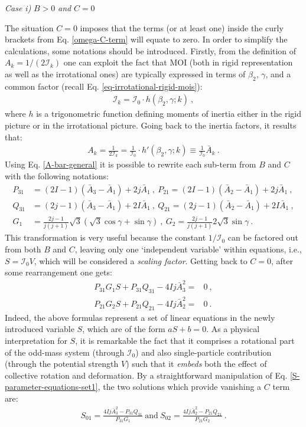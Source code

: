 \textit{Case i)} $B>0$ \textit{and} $C=0$

The situation $C=0$ imposes that the terms (or at least one) inside the curly brackets from Eq. \ref{omega-C-term} will equate to zero. In order to simplify the calculations, some notations should be introduced. Firstly, from the definition of $A_k=1/(2\mathcal{I}_k)$ one can exploit the fact that MOI (both in rigid representation as well as the irrotational ones) are typically expressed in terms of $\beta_2$, $\gamma$, and a common factor (recall Eq. \ref{eq-irrotational-rigid-mois}):
\begin{align}
    \mathcal{I}_k=\mathcal{I}_0\cdot h(\beta_2,\gamma;k)\ ,
\end{align}
where $h$ is a trigonometric function defining moments of inertia either in the rigid picture or in the irrotational picture. Going back to the inertia factors, it results that:
\begin{align}
    A_k=\frac{1}{2\mathcal{I}_k}=\frac{1}{\mathcal{I}_0}\cdot h'(\beta_2,\gamma;k)\equiv\frac{1}{\mathcal{I}_0}\bar{A}_k\ .
    \label{A-bar-general}
\end{align}
Using Eq. \ref{A-bar-general} it is possible to rewrite each sub-term from $B$ and $C$ with the following notations:
\begin{align}
    P_{31}&=(2I-1)(\bar{A}_3-\bar{A}_1)+2j\bar{A}_1\ ,\ P_{21}=(2I-1)(\bar{A}_2-\bar{A}_1)+2j\bar{A}_1\ , \nonumber\\
    Q_{31}&=(2j-1)(\bar{A}_3-\bar{A}_1)+2I\bar{A}_1\ ,\ Q_{21}=(2j-1)(\bar{A}_2-\bar{A}_1)+2I\bar{A}_1\ ,\nonumber\\
    G_1&=\frac{2j-1}{j(j+1)}\sqrt{3}\left(\sqrt{3}\cos\gamma+\sin\gamma\right)\ ,\ G_2=\frac{2j-1}{j(j+1)}2\sqrt{3}\sin\gamma\ .
    \label{P-Q-G1-G2-factors}
\end{align}
This transformation is very useful because the constant $1/\mathcal{I}_0$ can be factored out from both $B$ and $C$, leaving only one `independent variable' within equations, i.e., $S=\mathcal{I}_0V$, which will be considered a \emph{scaling factor}. Getting back to $C=0$, after some rearrangement one gets:
\begin{align}
    P_{31}G_1S+P_{31}Q_{31}-4Ij\bar{A}_3^2=&0\ ,\nonumber\\
    P_{21}G_2S+P_{21}Q_{21}-4Ij\bar{A}_2^2=&0\ .
    \label{S-parameter-equations-set1}
\end{align}
Indeed, the above formulas represent a set of linear equations in the newly introduced variable $S$, which are of the form $aS+b=0$. As a physical interpretation for $S$, it is remarkable the fact that it comprises a rotational part of the odd-mass system (through $\mathcal{I}_0$) and also single-particle contribution (through the potential strength $V$) such that it \emph{embeds} both the effect of collective rotation and deformation. By a straightforward manipulation of Eq. \ref{S-parameter-equations-set1}, the two solutions which provide vanishing a $C$ term are:
\begin{align}
    S_{01}=\frac{4Ij\bar{A}_3^2-P_{31}Q_{31}}{P_{31}G_1}\ \text{and}\ S_{02}=\frac{4Ij\bar{A}_2^2-P_{21}Q_{21}}{P_{21}G_2}\ .
    \label{C-Term-zero-solutions}
\end{align}


